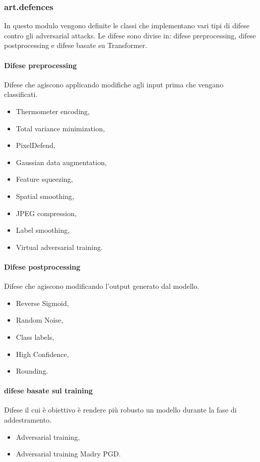 \subsubsection{art.defences}
In questo modulo vengono definite le classi che implementano vari tipi di difese contro gli adversarial attacks. Le difese sono divise in: difese preprocessing, difese postprocessing
e difese basate su Transformer.

\paragraph{Difese preprocessing}
Difese che agiscono applicando modifiche agli input prima che vengano classificati.
     \begin{itemize}
        \item Thermometer encoding,
        \item Total variance minimization,
        \item PixelDefend,
        \item Gaussian data augmentation,
        \item Feature squeezing,
        \item Spatial smoothing,
        \item JPEG compression,
        \item Label smoothing,
        \item Virtual adversarial training.
    \end{itemize}

\paragraph{Difese postprocessing}
Difese che agiscono modificando l'output generato dal modello.
\begin{itemize}
        \item Reverse Sigmoid,
        \item Random Noise,
        \item Class labels,
        \item High Confidence,
        \item Rounding.
    \end{itemize}
\paragraph{difese basate sul training}
Difese il cui è obiettivo è rendere più robusto un modello durante la fase di addestramento.
 \begin{itemize}
        \item Adversarial training,
        \item Adversarial training Madry PGD.
\end{itemize}
